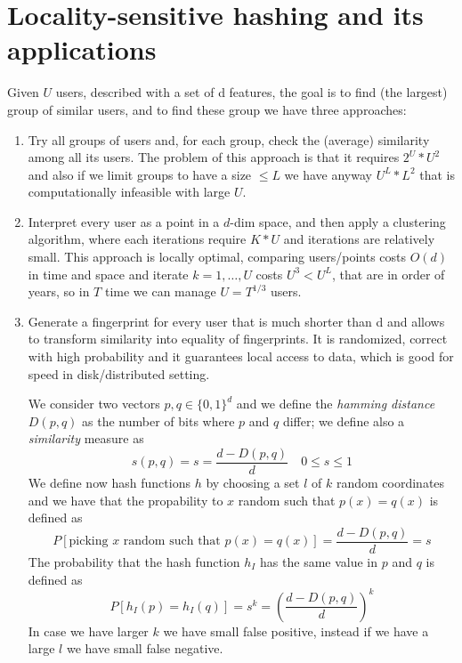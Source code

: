 \section{Locality-sensitive hashing and its applications}
    Given $U$ users, described with a set of d features, the goal is to find (the largest) group of similar users, and to find these group we have three approaches:
    \begin{enumerate}
	\item Try all groups of users and, for each group, check the (average) similarity among all its users.\newline
	      The problem of this approach is that it requires $2^U * U^2$ and also if we limit groups to have a size $\leq L$ we have anyway $U^L * L^2$ 
	      that is computationally infeasible with large $U$.

	\item Interpret every user as a point in a $d$-dim space, and then apply a clustering algorithm, where each iterations require $K * U$ and iterations are relatively small.\newline
	      This approach is locally optimal, comparing users/points costs $O(d)$ in time and space and iterate $k = 1, \dots, U$ costs $U^3 < U^L$, that are in order of years, so 
	      in $T$ time we can manage $U = T^{1/3}$ users.
	
	\item Generate a fingerprint for every user that is much shorter than d and allows to transform similarity into equality of fingerprints.\newline
	      It is randomized, correct with high probability and it guarantees local access to data, which is good for speed in disk/distributed setting.

	      We consider two vectors $p, q \in \{0, 1\}^d$ and we define the \emph{hamming distance} $D(p, q)$ as the number of bits where $p$ and $q$ differ;
	      we define also a \emph{similarity} measure as 
	      \[ s(p, q) = s = \frac{d - D(p, q)}{d} \quad 0 \leq s \leq 1 \]
	      We define now hash functions $h$ by choosing a set $l$ of $k$ random coordinates and we have that the propability to $x$ random such that $p(x) = q(x)$ is defined as 
	      \[ P[\text{picking } x \text{ random such that } p(x) = q(x)] = \frac{d - D(p, q)}{d} = s \]
	      The probability that the hash function $h_I$ has the same value in $p$ and $q$ is defined as 
	      \[ P[h_I(p) = h_I(q)] = s^k = (\frac{d - D(p, q)}{d})^k \]
	      In case we have larger $k$ we have small false positive, instead if we have a large $l$ we have small false negative.


\end{enumerate}
